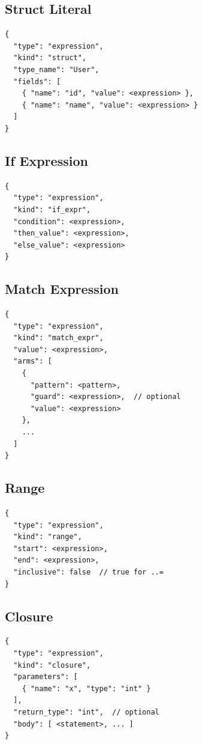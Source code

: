 \subsection{Struct Literal}

\begin{lstlisting}[language={}]
{
  "type": "expression",
  "kind": "struct",
  "type_name": "User",
  "fields": [
    { "name": "id", "value": <expression> },
    { "name": "name", "value": <expression> }
  ]
}
\end{lstlisting}

\subsection{If Expression}

\begin{lstlisting}[language={}]
{
  "type": "expression",
  "kind": "if_expr",
  "condition": <expression>,
  "then_value": <expression>,
  "else_value": <expression>
}
\end{lstlisting}

\subsection{Match Expression}

\begin{lstlisting}[language={}]
{
  "type": "expression",
  "kind": "match_expr",
  "value": <expression>,
  "arms": [
    {
      "pattern": <pattern>,
      "guard": <expression>,  // optional
      "value": <expression>
    },
    ...
  ]
}
\end{lstlisting}

\subsection{Range}

\begin{lstlisting}[language={}]
{
  "type": "expression",
  "kind": "range",
  "start": <expression>,
  "end": <expression>,
  "inclusive": false  // true for ..=
}
\end{lstlisting}

\subsection{Closure}

\begin{lstlisting}[language={}]
{
  "type": "expression",
  "kind": "closure",
  "parameters": [
    { "name": "x", "type": "int" }
  ],
  "return_type": "int",  // optional
  "body": [ <statement>, ... ]
}
\end{lstlisting}

